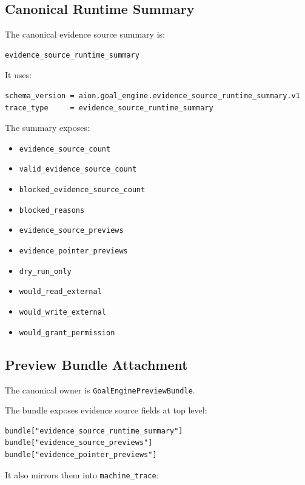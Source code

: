 \subsection{Canonical Runtime Summary}

The canonical evidence source summary is:

\begin{verbatim}
evidence_source_runtime_summary
\end{verbatim}

It uses:

\begin{verbatim}
schema_version = aion.goal_engine.evidence_source_runtime_summary.v1
trace_type     = evidence_source_runtime_summary
\end{verbatim}

The summary exposes:

\begin{itemize}
  \item \texttt{evidence\_source\_count}
  \item \texttt{valid\_evidence\_source\_count}
  \item \texttt{blocked\_evidence\_source\_count}
  \item \texttt{blocked\_reasons}
  \item \texttt{evidence\_source\_previews}
  \item \texttt{evidence\_pointer\_previews}
  \item \texttt{dry\_run\_only}
  \item \texttt{would\_read\_external}
  \item \texttt{would\_write\_external}
  \item \texttt{would\_grant\_permission}
\end{itemize}

\subsection{Preview Bundle Attachment}

The canonical owner is \texttt{GoalEnginePreviewBundle}.

The bundle exposes evidence source fields at top level:

\begin{verbatim}
bundle["evidence_source_runtime_summary"]
bundle["evidence_source_previews"]
bundle["evidence_pointer_previews"]
\end{verbatim}

It also mirrors them into \texttt{machine\_trace}:

